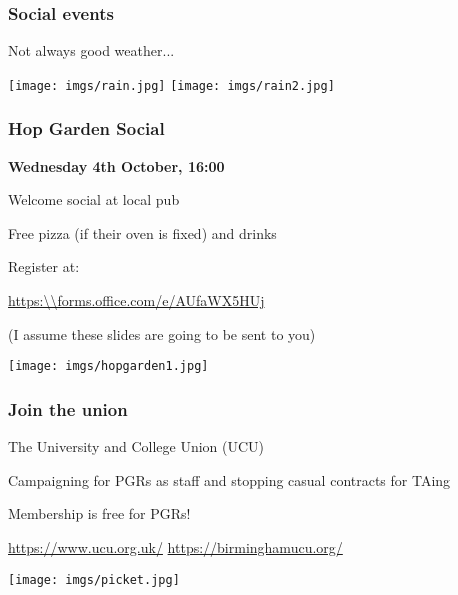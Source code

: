 \begin{frame}
    \frametitle{Social events}
    \centering

    \Large
    Not always good weather...

    \vspace{1em}

    \texttt{[image: imgs/rain.jpg]}
    \texttt{[image: imgs/rain2.jpg]}

\end{frame}


\begin{frame}
    \frametitle{Hop Garden Social}
    \centering

    \textbf{\LARGE Wednesday 4th October, 16:00}

    \vspace{1em}

    \begin{minipage}{0.4\textwidth}

        Welcome social at local pub

        Free \alert{pizza}
        {\scriptsize(if their oven is fixed)}
        and \alert{drinks}

        \vspace{1em}

        Register at:

        {\small}{\url{https:\\forms.office.com/e/AUfaWX5HUj}}

        \vspace{1em}

        \scriptsize
        (I assume these slides are going to be sent to you)
    \end{minipage}
    \qquad
    \begin{minipage}{0.4\textwidth}
        \texttt{[image: imgs/hopgarden1.jpg]}
    \end{minipage}
\end{frame}
\begin{frame}
    \frametitle{Join the union}
    \centering
    \begin{minipage}{0.40\textwidth}
        \centering
        The University and College Union (UCU)

        \vspace{1em}

        Campaigning for \alert{PGRs as staff} and stopping
        \alert{casual contracts} for TAing

        \vspace{1em}

        Membership is \alert{free} for PGRs!

        \vspace{1em}

        \url{https://www.ucu.org.uk/}
        \url{https://birminghamucu.org/}

    \end{minipage}
    \qquad
    \begin{minipage}{0.4\textwidth}
        \texttt{[image: imgs/picket.jpg]}
    \end{minipage}
\end{frame}
